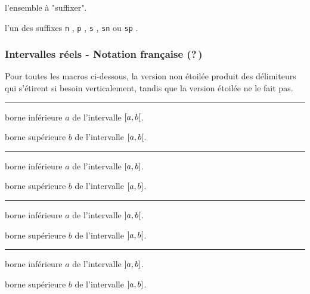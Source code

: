 \documentclass[12pt,a4paper]{article}
\theoremstyle{definition}
\newcommand\separation{
	\medskip
	\hfill\rule{0.5\textwidth}{0.75pt}\hfill
	\medskip
}
\newcommand\prefix[1]{%
	\texttt{#1}%
}
\begin{document}


 l'ensemble à "suffixer".

 l'un des suffixes \prefix{n}, \prefix{p}, \prefix{s}, \prefix{sn} ou \prefix{sp}.
\subsubsection{Intervalles réels - Notation française (?\,)}

Pour toutes les macros ci-dessous, la version non étoilée produit des délimiteurs qui s'étirent si besoin verticalement, tandis que la version étoilée ne le fait pas.


\separation





 borne inférieure $a$ de l'intervalle $\intervalCO{a}{b}$.

 borne supérieure $b$ de l'intervalle $\intervalCO{a}{b}$.


\separation




 borne inférieure $a$ de l'intervalle $\intervalC{a}{b}$.

 borne supérieure $b$ de l'intervalle $\intervalC{a}{b}$.


\separation




 borne inférieure $a$ de l'intervalle $\intervalO{a}{b}$.

 borne supérieure $b$ de l'intervalle $\intervalO{a}{b}$.


\separation




 borne inférieure $a$ de l'intervalle $\intervalOC{a}{b}$.

 borne supérieure $b$ de l'intervalle $\intervalOC{a}{b}$.



\end{document}
